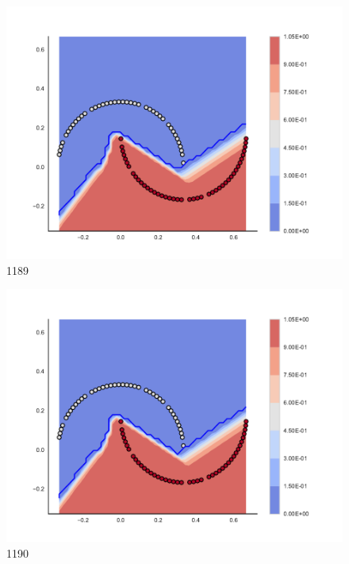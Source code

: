 \begin{subfigure}[b]{0.09\textwidth}
    \includegraphics[clip, trim=2.35cm 1.75cm 4.5cm 0cm,width=\textwidth]{img/convergence/1189.pdf}
    \caption{1189}
    \label{fig:convergence_1189}
\end{subfigure}
%
\begin{subfigure}[b]{0.09\textwidth}
    \includegraphics[clip, trim=2.35cm 1.75cm 4.5cm 0cm,width=\textwidth]{img/convergence/1190.pdf}
    \caption{1190}
    \label{fig:convergence_1190}
\end{subfigure}
%
